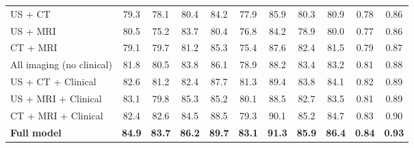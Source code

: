 \documentclass[a4paper, fleqn]{cas-dc}
\begin{document}
\begin{table}[htbp]
\begin{tabular*}{\tblwidth}{@{} l|ccccccc|ccc @{}}
            \midrule US + CT                                       & 79.3                                                  & 78.1                                        & 80.4          & 84.2          & 77.9             & 85.9          & 80.3              & 80.9              & 0.78          & 0.86          \\
            US + MRI                                               & 80.5                                                  & 75.2                                        & 83.7          & 80.4          & 76.8             & 84.2          & 78.9              & 80.0              & 0.77          & 0.86          \\
            CT + MRI                                               & 79.1                                                  & 79.7                                        & 81.2          & 85.3          & 75.4             & 87.6          & 82.4              & 81.5              & 0.79          & 0.87          \\
            \midrule All imaging (no clinical)                     & 81.8                                                  & 80.5                                        & 83.8          & 86.1          & 78.9             & 88.2          & 83.4              & 83.2              & 0.81          & 0.88          \\
            US + CT + Clinical                                     & 82.6                                                  & 81.2                                        & 82.4          & 87.7          & 81.3             & 89.4          & 83.8              & 84.1              & 0.82          & 0.89          \\
            US + MRI + Clinical                                    & 83.1                                                  & 79.8                                        & 85.3          & 85.2          & 80.1             & 88.5          & 82.7              & 83.5              & 0.81          & 0.89          \\
            CT + MRI + Clinical                                    & 82.4                                                  & 82.6                                        & 84.5          & 88.5          & 79.3             & 90.1          & 85.2              & 84.7              & 0.83          & 0.90          \\
            \midrule \textbf{Full model}                           & \textbf{84.9}                                         & \textbf{83.7}                               & \textbf{86.2} & \textbf{89.7} & \textbf{83.1}    & \textbf{91.3} & \textbf{85.9}     & \textbf{86.4}     & \textbf{0.84} & \textbf{0.93} \\

\end{tabular*}
\end{table}
\end{document}
